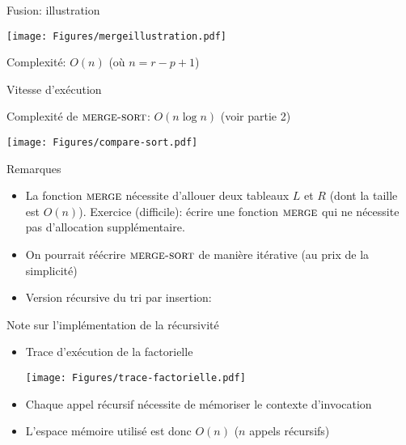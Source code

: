 \begin{frame}{Fusion: illustration}

\centerline{\texttt{[image: Figures/mergeillustration.pdf]}}

\bigskip

Complexité: $O(n)$ (où $n=r-p+1$)

\end{frame}

\begin{frame}{Vitesse d'exécution}

Complexité de $\textnormal{\scshape merge-sort}$: $O(n\log n)$ (voir partie 2)

\bigskip

\centerline{\texttt{[image: Figures/compare-sort.pdf]}}


\end{frame}

\begin{frame}{Remarques}

\begin{itemize}
\item La fonction $\textnormal{\scshape merge}$ nécessite d'allouer deux tableaux $L$
  et $R$ (dont la taille est $O(n)$). Exercice (difficile): écrire une
  fonction $\textnormal{\scshape merge}$ qui ne nécessite pas d'allocation
  supplémentaire.
\item On pourrait réécrire $\textnormal{\scshape merge-sort}$ de manière itérative (au prix de la simplicité)
\item Version récursive du tri par insertion:
\begin{center}
\end{center}
\end{itemize}

\end{frame}

\begin{frame}{Note sur l'implémentation de la récursivité}
\begin{itemize}
\item Trace d'exécution de la factorielle
\centerline{\texttt{[image: Figures/trace-factorielle.pdf]}}
\item Chaque appel récursif nécessite de mémoriser le \alert{contexte d'invocation}
\item L'espace mémoire utilisé est donc $O(n)$ ($n$ appels récursifs)
\end{itemize}
\end{frame}

